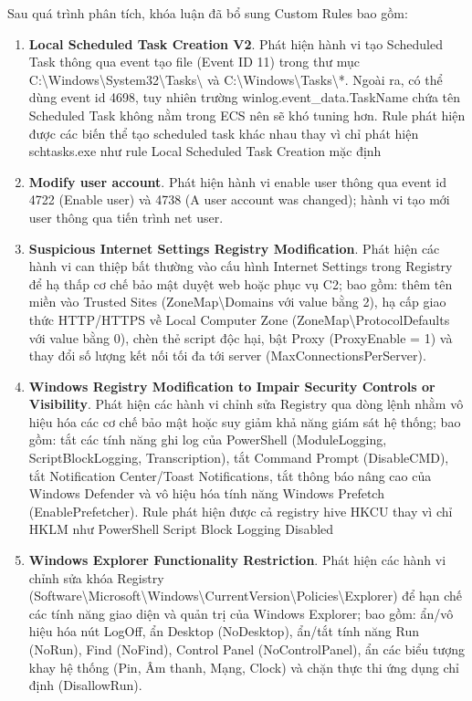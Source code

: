Sau quá trình phân tích, khóa luận đã bổ sung \CustomRulesWritten Custom Rules bao gồm:
\begin{enumerate}
\item \textbf{Local Scheduled Task Creation V2}. Phát hiện hành vi tạo Scheduled Task thông qua event tạo file (Event ID 11) trong thư mục C:\textbackslash{}Windows\textbackslash{}System32\textbackslash{}Tasks\textbackslash{} và C:\textbackslash{}Windows\textbackslash{}Tasks\textbackslash{}*. Ngoài ra, có thể dùng event id 4698, tuy nhiên trường winlog.event\_data.TaskName chứa tên Scheduled Task không nằm trong ECS nên sẽ khó tuning hơn. Rule phát hiện được các biến thể tạo scheduled task khác nhau thay vì chỉ phát hiện schtasks.exe như rule Local Scheduled Task Creation mặc định
\item \textbf{Modify user account}. Phát hiện hành vi enable user thông qua event id 4722 (Enable user) và 4738 (A user account was changed); hành vi tạo mới user thông qua tiến trình net user.
\item \textbf{Suspicious Internet Settings Registry Modification}. Phát hiện các hành vi can thiệp bất thường vào cấu hình Internet Settings trong Registry để hạ thấp cơ chế bảo mật duyệt web hoặc phục vụ C2; bao gồm: thêm tên miền vào Trusted Sites (ZoneMap\textbackslash{}Domains với value bằng 2), hạ cấp giao thức HTTP/HTTPS về Local Computer Zone (ZoneMap\textbackslash{}ProtocolDefaults với value bằng 0), chèn thẻ script độc hại, bật Proxy (ProxyEnable = 1) và thay đổi số lượng kết nối tối đa tới server (MaxConnectionsPerServer).
\item \textbf{Windows Registry Modification to Impair Security Controls or Visibility}. Phát hiện các hành vi chỉnh sửa Registry qua dòng lệnh nhằm vô hiệu hóa các cơ chế bảo mật hoặc suy giảm khả năng giám sát hệ thống; bao gồm: tắt các tính năng ghi log của PowerShell (ModuleLogging, ScriptBlockLogging, Transcription), tắt Command Prompt (DisableCMD), tắt Notification Center/Toast Notifications, tắt thông báo nâng cao của Windows Defender và vô hiệu hóa tính năng Windows Prefetch (EnablePrefetcher). Rule phát hiện được cả registry hive HKCU thay vì chỉ HKLM như PowerShell Script Block Logging Disabled
\item \textbf{Windows Explorer Functionality Restriction}. Phát hiện các hành vi chỉnh sửa khóa Registry (Software\textbackslash{}Microsoft\textbackslash{}Windows\textbackslash{}CurrentVersion\textbackslash{}Policies\textbackslash{}Explorer) để hạn chế các tính năng giao diện và quản trị của Windows Explorer; bao gồm: ẩn/vô hiệu hóa nút LogOff, ẩn Desktop (NoDesktop), ẩn/tắt tính năng Run (NoRun), Find (NoFind), Control Panel (NoControlPanel), ẩn các biểu tượng khay hệ thống (Pin, Âm thanh, Mạng, Clock) và chặn thực thi ứng dụng chỉ định (DisallowRun).

\end{enumerate}
